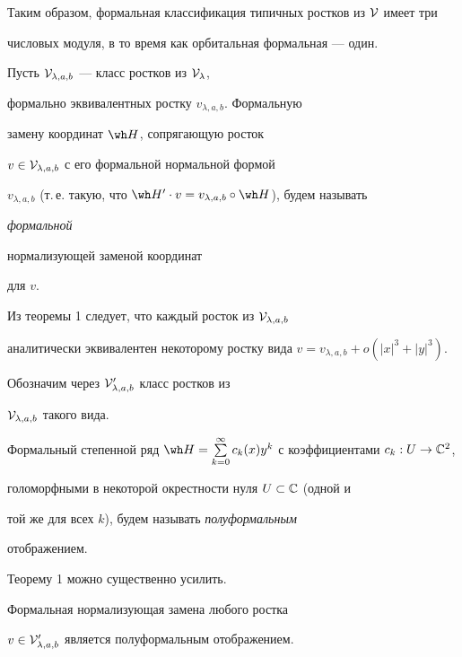 Таким образом, формальная классификация типичных ростков из ${\cal V}$ имеет три


числовых модуля, в то время как орбитальная формальная --- один.





Пусть ${\cal V}_{\lambda,a,b}$ --- класс ростков из ${\cal V}_\lambda$,


формально эквивалентных ростку $v_{\lambda,a,b}$. Формальную


замену координат $\wh H$, сопрягающую росток


$v\in{\cal V}_{\lambda,a,b}$ с его формальной нормальной формой


$v_{\lambda,a,b}$ (т.\,е. такую, что $\wh H'\cdot v=


v_{\lambda,a,b}\circ\wh H$), будем называть {\it формальной


нормализующей заменой координат} для $v$.





Из теоремы 1 следует, что каждый росток из ${\cal V}_{\lambda,a,b}$


аналитически эквивалентен некоторому ростку вида $


v=v_{\lambda,a,b}+o(|x|^3+|y|^3). $


Обозначим через ${\cal V}'_{\lambda,a,b}$ класс ростков из


${\cal V}_{\lambda,a,b}$ такого вида.





\begin{defn}


Формальный степенной ряд $\wh


H=\sum\limits^\infty_{k=0}c_k(x) y^k$ с коэффициентами $c_k:U\to\Bbb C^2$,


голоморфными в некоторой окрестности нуля $U\subset\Bbb C$ (одной и


той же для всех $k$), будем называть {\it полуформальным}


отображением.


\end{defn}





Теорему 1 можно существенно усилить.





\begin{thm}


Формальная нормализующая замена любого ростка


$v\in{\cal V}'_{\lambda,a,b}$ является полуформальным отображением.


\end{thm}





